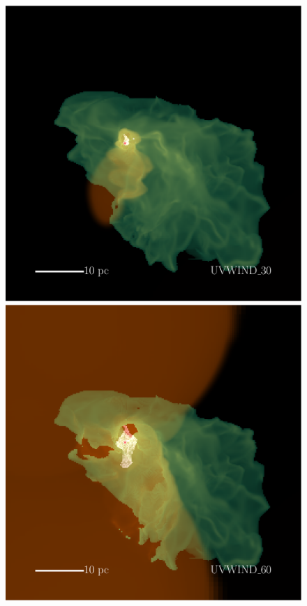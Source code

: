 \documentclass[a4paper,fleqn,usenatbib]{mnras}
\begin{document}
\begin{figure}
	\includegraphics[width=0.99\columnwidth]{plots/fig11a.pdf} \includegraphics[width=0.99\columnwidth]{plots/fig11b.pdf}

\end{figure}
\end{document}

